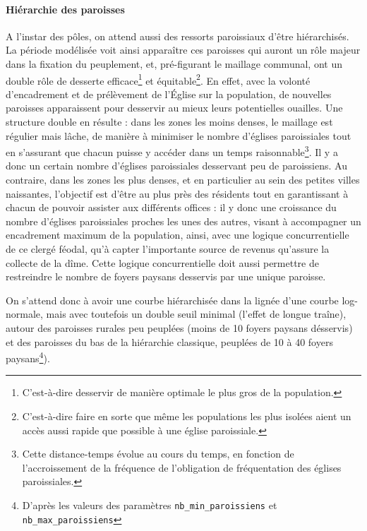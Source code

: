 \paragraph{Hiérarchie des paroisses}

A l'instar des pôles, on attend aussi des ressorts paroissiaux d'être hiérarchisés.
La période modélisée voit ainsi apparaître ces paroisses qui auront un rôle majeur dans la fixation du peuplement, et, pré-figurant le maillage communal, ont un double rôle de desserte efficace\footnote{C'est-à-dire desservir de manière optimale le plus gros de la population.} et équitable\footnote{C'est-à-dire faire en sorte que même les populations les plus isolées aient un accès aussi rapide que possible à une église paroissiale.}.
En effet, avec la volonté d'encadrement et de prélèvement de l'Église sur la population, de nouvelles paroisses apparaissent pour desservir au mieux leurs potentielles ouailles.
Une structure double en résulte :
dans les zones les moins denses, le maillage est régulier mais lâche, de manière à minimiser le nombre d'églises paroissiales tout en s'assurant que chacun puisse y accéder dans un temps raisonnable\footnote{Cette distance-temps évolue au cours du temps, en fonction de l'accroissement de la fréquence de l'obligation de fréquentation des églises paroissiales.}.
Il y a donc un certain nombre d'églises paroissiales desservant peu de paroissiens.
Au contraire, dans les zones les plus denses, et en particulier au sein des petites villes naissantes, l'objectif est d'être au plus près des résidents tout en garantissant à chacun de pouvoir assister aux différents offices :
il y donc une croissance du nombre d'églises paroissiales proches les unes des autres, visant à accompagner un encadrement maximum de la population, ainsi, avec une logique concurrentielle de ce clergé féodal, qu'à capter l'importante source de revenus qu'assure la collecte de la dîme.
Cette logique concurrentielle doit aussi permettre de restreindre le nombre de foyers paysans desservis par une unique paroisse.

On s'attend donc à avoir une courbe hiérarchisée dans la lignée d'une courbe log-normale, mais avec toutefois un double seuil minimal (l'effet de \og longue traîne\fg{}), autour des paroisses \og rurales\fg{} peu peuplées (moins de 10 foyers paysans désservis) et des paroisses du bas de la hiérarchie classique, peuplées de 10 à 40 foyers paysans\footnote{D'après les valeurs des paramètres \texttt{nb\_min\_paroissiens} et \texttt{nb\_max\_paroissiens}}).

